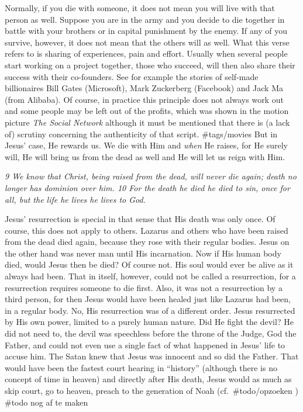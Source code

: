 Normally, if you die with someone, it does not mean you will live with
that person as well. Suppose you are in the army and you decide to die
together in battle with your brothers or in capital punishment by the
enemy. If any of you survive, however, it does not mean that the others
will as well. What this verse refers to is sharing of experiences, pain
and effort. Usually when several people start working on a project
together, those who succeed, will then also share their success with
their co-founders. See for example the stories of self-made billionaires
Bill Gates (Microsoft), Mark Zuckerberg (Facebook) and Jack Ma (from
Alibaba). Of course, in practice this principle does not always work out
and some people may be left out of the profits, which was shown in the
motion picture \emph{The Social Network} although it must be mentioned
that there is (a lack of) scrutiny concerning the authenticity of that
script. \#tags/movies But in Jesus' case, He rewards us. We die with Him
and \emph{when} He raises, for He surely will, He will bring us from the
dead as well and He will let us reign with Him.

\emph{9 We know that Christ, being raised from the dead, will never die
again; death no longer has dominion over him. 10 For the death he died
he died to sin, once for all, but the life he lives he lives to God.}

Jesus' resurrection is special in that sense that His death was only
once. Of course, this does not apply to others. Lazarus and others who
have been raised from the dead died again, because they rose with their
regular bodies. Jesus on the other hand was never man until His
incarnation. Now if His human body died, would Jesus then be died? Of
course not. His soul would ever be alive as it always had been. That in
itself, however, could not be called a resurrection, for a resurrection
requires someone to die first. Also, it was not a resurrection by a
third person, for then Jesus would have been healed just like Lazarus
had been, in a regular body. No, His resurrection was of a different
order. Jesus resurrected by His own power, limited to a purely human
nature. Did He fight the devil? He did not need to, the devil was
speechless before the throne of the Judge, God the Father, and could not
even use a single fact of what happened in Jesus' life to accuse him.
The Satan knew that Jesus was innocent and so did the Father. That would
have been the fastest court hearing in ``history'' (although there is no
concept of time in heaven) and directly after His death, Jesus would as
much as skip court, go to heaven, preach to the generation of Noah
(cf.~\#todo/opzoeken ) \#todo nog af te maken

